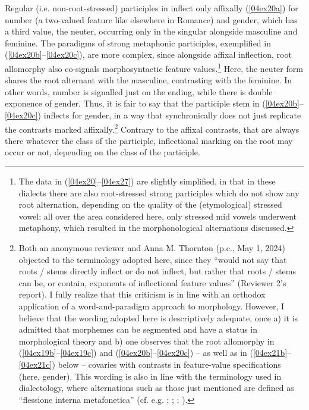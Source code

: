 \documentclass[output=paper,colorlinks,citecolor=brown]{langscibook}
\begin{document}
Regular (i.e. non-root-stressed) participles in  inflect only affixally (\ref{04ex20a}) for number (a two-valued feature like elsewhere in Romance) and gender, which has a third value, the neuter, occurring only in the singular alongside masculine and feminine. The paradigms of strong metaphonic participles, exemplified in (\ref{04ex20b}--\ref{04ex20c}), are more complex, since alongside affixal inflection, root allomorphy also co-signals morphosyntactic feature values.\footnote{The data in (\ref{04ex20}--\ref{04ex27}) are slightly simplified, in that in these dialects there are also root-stressed strong participles which do not show any root alternation, depending on the quality of the (etymological) stressed vowel: all over the area considered here, only stressed mid vowels underwent metaphony, which resulted in the morphonological alternations discussed.} Here, the neuter form shares the root alternant with the masculine, contrasting with the feminine. In other words, number is signalled just on the ending, while there is double exponence of gender. Thus, it is fair to say that the participle stem in (\ref{04ex20b}--\ref{04ex20c}) inflects for gender, in a way that synchronically does not just replicate the contrasts marked affixally.\footnote{Both an anonymous reviewer and Anna M. Thornton (p.c., May 1, 2024) objected to the terminology adopted here, since they ``would not say that roots / stems directly inflect or do not inflect, but rather that roots / stems can be, or contain, exponents of inflectional feature values'' (Reviewer 2's report). I fully realize that this criticism is in line with an orthodox application of a word-and-paradigm approach to morphology. However, I believe that the wording adopted here is descriptively adequate, once a) it is admitted that morphemes can be segmented and have a status in morphological theory and b) one observes that the root allomorphy in (\ref{04ex19b}--\ref{04ex19c}) and (\ref{04ex20b}--\ref{04ex20c}) -- as well as in (\ref{04ex21b}--\ref{04ex21c}) below -- covaries with contrasts in feature-value specifications (here, gender). This wording is also in line with the terminology used in  dialectology, where alternations such as those just mentioned are defined as ``flessione interna metafonetica'' (cf. e.g. \citealt{delia1976}; \citealt[98]{paciaroninoleloporcaro2013}; \citealt[60--61]{maturi2023}; \citealt[55]{mileti2024}).} Contrary to the affixal contrasts, that are always there whatever the class of the participle, inflectional marking on the root may occur or not, depending on the class of the participle.
\end{document}
